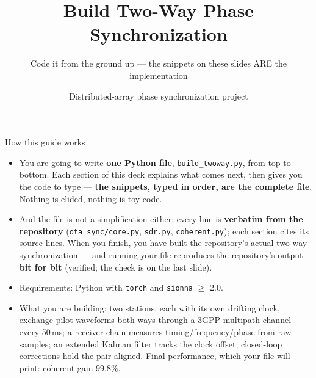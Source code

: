 \documentclass[10pt]{beamer}
\title{Build Two-Way Phase Synchronization}
\subtitle{Code it from the ground up --- the snippets on these slides
ARE the implementation}
\author{Distributed-array phase synchronization project}
\date{}
\begin{document}
\begin{frame}
  \titlepage
\end{frame}

\begin{frame}{How this guide works}
  \begin{itemize}
    \item You are going to write \textbf{one Python file},
      \texttt{build\_twoway.py}, from top to bottom. Each section of
      this deck explains what comes next, then gives you the code to
      type --- \textbf{the snippets, typed in order, are the complete
      file}. Nothing is elided, nothing is toy code.
    \item And the file is not a simplification either: every line is
      \textbf{verbatim from the repository}
      (\texttt{ota\_sync/core.py}, \texttt{sdr.py},
      \texttt{coherent.py}); each section cites its source lines.
      When you finish, you have built the repository's actual two-way
      synchronization --- and running your file reproduces the
      repository's output \textbf{bit for bit} (verified; the check
      is on the last slide).
    \item Requirements: Python with \texttt{torch} and
      \texttt{sionna} $\geq$ 2.0.
    \item What you are building: two stations, each with its own
      drifting clock, exchange pilot waveforms both ways through a
      3GPP multipath channel every 50\,ms; a receiver chain measures
      timing/frequency/phase from raw samples; an extended Kalman
      filter tracks the clock offset; closed-loop corrections hold
      the pair aligned. Final performance, which your file will
      print: coherent gain 99.8\%.
  \end{itemize}
\end{frame}
\end{document}
